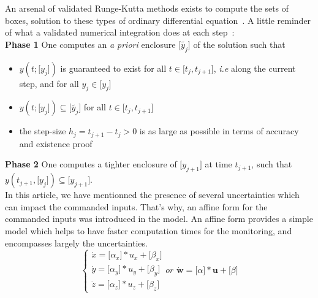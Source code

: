 \documentclass[letterpaper, 10 pt, conference]{ieeeconf}  %
\begin{document}
An arsenal of validated Runge-Kutta methods exists to compute the sets of boxes, solution to these types of ordinary differential equation~\cite{Sandretto}. A little reminder of what a validated numerical integration does at each step~\cite{Sandretto}:\vspace{0.2cm}\\ 
\textbf{Phase 1  } One computes an \textit{a priori} enclosure $\lbrack \tilde{y_{j}} \rbrack$ of the solution such that
\begin{itemize}
  \item $y(t;\lbrack y_{j} \rbrack)$ is guaranteed to exist for all $t \in \lbrack t_{j}, t_{j+1} \rbrack$, \textit{i.e} along the current step, and for all $y_{j} \in \lbrack y_{j} \rbrack$ \vspace{0.2 cm}
  \item $y(t; \lbrack y_{j} \rbrack ) \subseteq \lbrack \tilde{y_{j}} \rbrack$ for all $t \in \lbrack t_{j}, t_{j+1} \rbrack$ \vspace{0.2cm}
  \item the step-size $h_{j} = t_{j+1} - t_{j} > 0$ is as large as possible in terms of accuracy and existence proof \vspace{0.2 cm}
\end{itemize}
\textbf{Phase 2  } One computes a tighter enclosure of $\lbrack y_{j+1} \rbrack$ at time $t_{j+1}$, such that $y(t_{j+1}, \lbrack y_{j} \rbrack ) \subseteq \lbrack y_{j+1} \rbrack$.\\

In this article, we have mentionned the presence of several uncertainties which can impact the commanded inputs. That's why, an affine form for the commanded inputs was introduced in the model. An affine form provides a simple model which helps to have faster computation times for the monitoring, and encompasses largely the uncertainties.
\begin{equation}
    \left\{
    \begin{array}{ll}
        \dot{x} = \lbrack \alpha_{x} \rbrack * u_{x} + \lbrack \beta_{x} \rbrack  \\
        \dot{y} = \lbrack \alpha_{y} \rbrack * u_{y} + \lbrack \beta_{y} \rbrack  \\
        \dot{z} = \lbrack \alpha_{z} \rbrack * u_{z} + \lbrack \beta_{z} \rbrack
    \end{array}
    \textit{or } \dot{\textbf{w}} = \lbrack \alpha \rbrack * \textbf{u} + \lbrack \beta \rbrack
    \right.
\end{equation}
\end{document}

